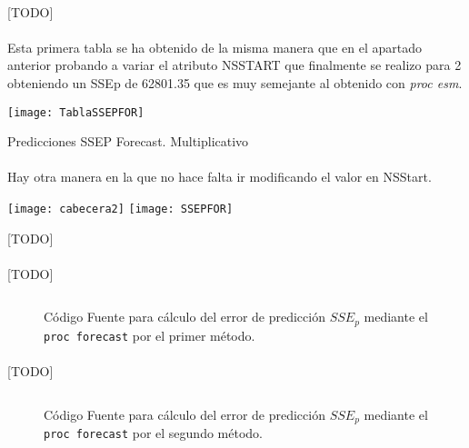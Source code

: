 \documentclass[a4paper, spanish]{article}
\begin{document}
    \paragraph{}
    [TODO]

    \paragraph{}
    Esta primera tabla se ha obtenido de la misma manera que en el apartado anterior probando a variar  el  atributo NSSTART que finalmente se realizo para 2 obteniendo un SSEp de 62801.35 que es muy semejante al obtenido con \textit{proc esm}.

    \begin{table}[htb!]
      \centering
      \texttt{[image: TablaSSEPFOR]}
      \caption{Predicciones SSEP Forecast. Multiplicativo}
      \label{}
    \end{table}

    \paragraph{}
    Hay otra manera en la que no hace falta ir modificando el valor en NSStart.

    \begin{table}[htb!]
      \centering
      \texttt{[image: cabecera2]}
      \texttt{[image: SSEPFOR]}
      \caption{[TODO]}
      \label{}
    \end{table}

    \paragraph{}
    [TODO]

    \begin{figure}[htb!]
      \centering
      \inputminted{SAS}{./res/code/e-prediction-forecast-method-1.sas}
      \caption{Código Fuente para cálculo del error de predicción $SSE_p$ mediante el \texttt{proc forecast} por el primer método.}
      \label{code:prediction_forecast_method_2}
    \end{figure}

    \paragraph{}
    [TODO]

    \begin{figure}[htb!]
      \centering
      \inputminted{SAS}{./res/code/e-prediction-forecast-method-2.sas}
      \caption{Código Fuente para cálculo del error de predicción $SSE_p$ mediante el \texttt{proc forecast} por el segundo método.}
      \label{code:prediction_forecast_method_2}
    \end{figure}
\end{document}

